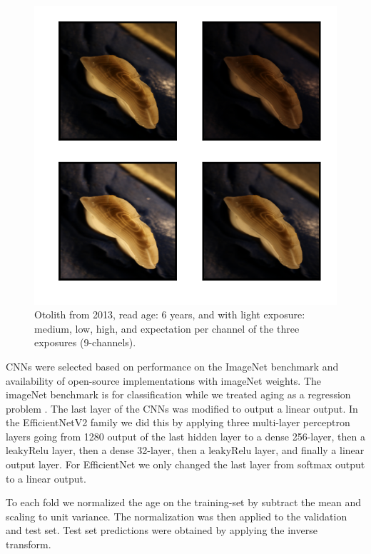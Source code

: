 \documentclass[10pt,letterpaper]{article}
\begin{document}
\begin{figure}[h!]
  \caption{Otolith from 2013, read age: 6 years, and with light exposure: medium, low, high, 
  and expectation per channel of the three exposures (9-channels). }
  \centering
  \includegraphics[scale=1.0]{otolith/2013_70174_Nr06_age09_IMG_0031_32_33.png}
  
  \label{marker4}
\end{figure}

CNNs were selected based on performance on the ImageNet benchmark and availability of open-source implementations with imageNet weights. The imageNet benchmark is for classification while we treated aging as a regression problem \citep{moenetal} \citep{vaboeetal}. The last layer of the CNNs was modified to output a linear output. In the EfficientNetV2 family we did this by applying three multi-layer perceptron layers going from 1280 output of the last hidden layer to a dense 256-layer, 
then a leakyRelu \citep{DBLP:journals/corr/XuWCL15} layer, then a dense 32-layer, then a leakyRelu layer, and finally a linear output layer. For EfficientNet we only changed the last layer from softmax output to a linear output.

To each fold we normalized the age on the training-set by subtract the mean and scaling to unit variance. The normalization was then applied to the validation and test set. Test set predictions were obtained by applying the inverse transform.
\end{document}
